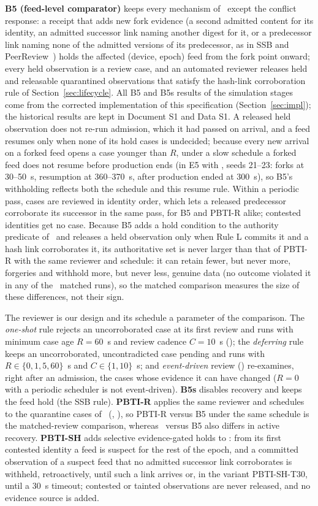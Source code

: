 \textbf{B5 (feed-level comparator)} keeps every mechanism of \sys\ except the conflict response: a receipt that adds new fork evidence (a second admitted content for its identity, an admitted successor link naming another digest for it, or a predecessor link naming none of the admitted versions of its predecessor, as in SSB and PeerReview~\cite{tarr2019ssb,haeberlen2007peerreview}) holds the affected (device, epoch) feed from the fork point onward; every held observation is a review case, and an automated reviewer releases held and releasable quarantined observations that satisfy the hash-link corroboration rule of Section~\ref{sec:lifecycle}. All B5 and B5s results of the simulation stages come from the corrected implementation of this specification (Section~\ref{sec:impl}); the historical results are kept in Document S1 and Data S1. A released held observation does not re-run admission, which it had passed on arrival, and a feed resumes only when none of its hold cases is undecided; because every new arrival on a forked feed opens a case younger than $R$, under a slow schedule a forked feed does not resume before production ends (in E5 with \Bhist, seeds 21--23: forks at 30--50~s, resumption at 360--370~s, after production ended at 300~s), so B5's withholding reflects both the schedule and this resume rule. Within a periodic pass, cases are reviewed in identity order, which lets a released predecessor corroborate its successor in the same pass, for B5 and PBTI-R alike; contested identities get no case. Because B5 adds a hold condition to the authority predicate of \sys\ and releases a held observation only when Rule L commits it and a hash link corroborates it, its authoritative set is never larger than that of PBTI-R with the same reviewer and schedule: it can retain fewer, but never more, forgeries and withhold more, but never less, genuine data (no outcome violated it in any of the \XSubsetRuns\ matched runs), so the matched comparison measures the size of these differences, not their sign.

The reviewer is our design and its schedule a parameter of the comparison. The \emph{one-shot} rule rejects an uncorroborated case at its first review and runs with minimum case age $R=60$~s and review cadence $C=10$~s (\Bhist); the \emph{deferring} rule keeps an uncorroborated, uncontradicted case pending and runs with $R\in\{0,1,5,60\}$~s and $C\in\{1,10\}$~s; and \emph{event-driven} review (\Bev) re-examines, right after an admission, the cases whose evidence it can have changed ($R=0$ with a periodic scheduler is not event-driven). \textbf{B5s} disables recovery and keeps the feed hold (the SSB rule). \textbf{PBTI-R} applies the same reviewer and schedules to the quarantine cases of \sys\ (\Rhist, \Rev), so PBTI-R versus B5 under the same schedule is the matched-review comparison, whereas \sys\ versus B5 also differs in active recovery. \textbf{PBTI-SH} adds selective evidence-gated holds to \sys: from its first contested identity a feed is suspect for the rest of the epoch, and a committed observation of a suspect feed that no admitted successor link corroborates is withheld, retroactively, until such a link arrives or, in the variant PBTI-SH-T30, until a 30~s timeout; contested or tainted observations are never released, and no evidence source is added.

